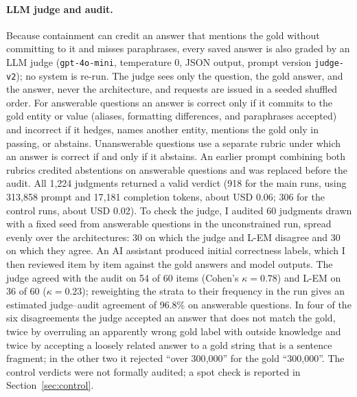 \documentclass[11pt,a4paper]{article}
\newcommand{\lem}{L-EM}
\begin{document}
\paragraph{LLM judge and audit.}
Because containment can credit an answer that mentions the gold without
committing to it and misses paraphrases, every saved answer is also graded by
an LLM judge (\texttt{gpt-4o-mini}, temperature 0, JSON output,
prompt version \texttt{judge-v2}); no system is re-run.
The judge sees only the question, the gold answer, and the answer, never the
architecture, and requests are issued in a seeded shuffled order.
For answerable questions an answer is correct only if it commits to the gold
entity or value (aliases, formatting differences, and paraphrases accepted)
and incorrect if it hedges, names another entity, mentions the gold only in
passing, or abstains.
Unanswerable questions use a separate rubric under which an answer is correct
if and only if it abstains.
An earlier prompt combining both rubrics credited abstentions on answerable
questions and was replaced before the audit.
All 1{,}224 judgments returned a valid verdict (918 for the main runs, using
313{,}858 prompt and 17{,}181 completion tokens, about USD 0.06; 306 for the
control runs, about USD 0.02).
To check the judge, I audited 60 judgments drawn with a fixed seed from
answerable questions in the unconstrained run, spread evenly over the
architectures: 30 on which the judge and \lem{} disagree and 30 on which they
agree.
An AI assistant produced initial correctness labels, which I then reviewed
item by item against the gold answers and model outputs.
The judge agreed with the audit on 54 of 60 items (Cohen's $\kappa = 0.78$)
and \lem{} on 36 of 60 ($\kappa = 0.23$); reweighting the strata to their
frequency in the run gives an estimated judge--audit agreement of 96.8\% on
answerable questions.
In four of the six disagreements the judge accepted an answer that does not
match the gold, twice by overruling an apparently wrong gold label with outside
knowledge and twice by accepting a loosely related answer to a gold string
that is a sentence fragment; in the other two it rejected ``over 300{,}000''
for the gold ``300{,}000''.
The control verdicts were not formally audited; a spot check is reported in
Section~\ref{sec:control}.
\end{document}
